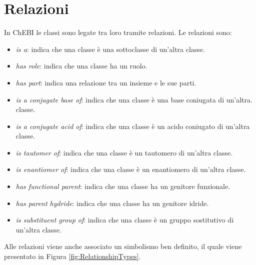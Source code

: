 \documentclass[12pt,a4paper,openright,twoside]{book}
\begin{document}


\chapter{Relazioni}
\label{chap:relationships}

In ChEBI le classi sono legate tra loro tramite relazioni. Le relazioni sono:
\begin{itemize}
	\item \textit{is a}: indica che una classe è una sottoclasse di un'altra classe.
	\item \textit{has role}: indica che una classe ha un ruolo.
	\item \textit{has part}: indica una relazione tra un insieme e le sue parti.
	\item \textit{is a conjugate base of}: indica che una classe è una base coniugata di un'altra. classe.
	\item \textit{is a conjugate acid of}: indica che una classe è un acido coniugato di un'altra classe.
	\item \textit{is tautomer of}: indica che una classe è un tautomero di un'altra classe.
	\item \textit{is enantiomer of}: indica che una classe è un enantiomero di un'altra classe.
	\item \textit{has functional parent}: indica che una classe ha un genitore funzionale.
	\item \textit{has parent hydride}: indica che una classe ha un genitore idride.
	\item \textit{is substituent group of}: indica che una classe è un gruppo sostitutivo di un'altra classe.
\end{itemize}

Alle relazioni viene anche associato un simbolismo ben definito, il quale viene presentato in Figura \ref{fig:RelationshipTypes}.
\end{document}
